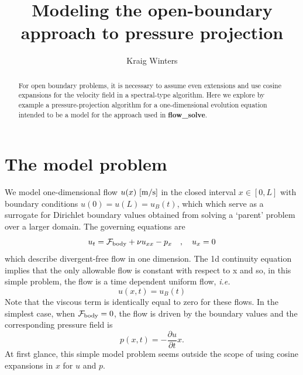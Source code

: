 \documentclass{jfm}
\title{Modeling the open-boundary approach to pressure projection}
\author{Kraig Winters}
\affiliation{Scripps Institution of Oceanography, University of California San Diego,La Jolla, CA 92093, USA
}
\begin{document}
\maketitle

\begin{abstract}
For open boundary problems, it is necessary to assume even extensions and use cosine expansions for the velocity field in a spectral-type algorithm. Here we explore by example a pressure-projection algorithm for a one-dimensional evolution equation intended to be a model for the approach used in {\bf flow\_solve}.
\end{abstract}


\section{The model problem}
We model one-dimensional flow $u(x)~[{\rm m/s}]$ in the closed interval $x \in [0,L]$ with boundary conditions $u(0)=u(L)=u_B(t)$, which which serve as a surrogate for Dirichlet boundary values obtained from solving a `parent' problem over a larger domain.
The governing equations are
\begin{equation}
u_t = {\mathcal F}_{\rm body} + \nu u_{xx} - p_x ~~~,~~~ u_x=0
\end{equation}
which describe divergent-free flow in one dimension. The 1d continuity equation implies that the only allowable flow is constant with respect to x and so, in this simple problem, the flow is a time dependent
uniform flow, {\em i.e.}
\begin{equation}
u(x,t) = u_B(t)
\end{equation}
Note that the viscous term is identically equal to zero for these flows.
In the simplest case, when ${\mathcal F}_{\rm body} =0$, the flow is driven by the boundary values and the corresponding pressure field is
\begin{equation}
p(x,t) = -\frac{\partial u}{\partial t} x.
\end{equation}
At first glance, this simple model problem seems outside the scope of using cosine expansions in $x$ for $u$ and $p$.
\end{document}
